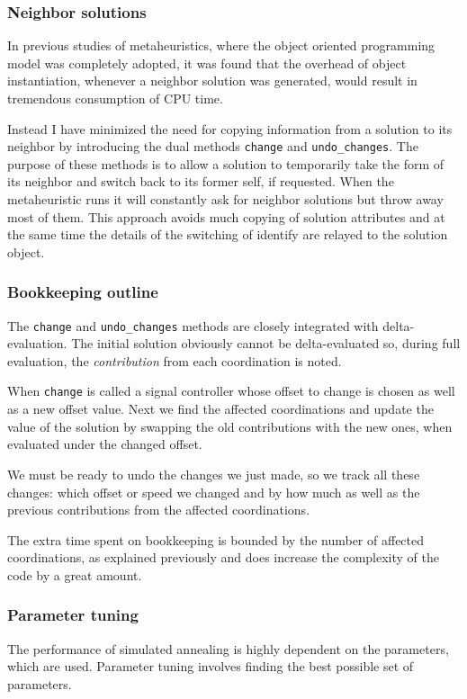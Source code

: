 \subsubsection{Neighbor solutions}
In previous studies of metaheuristics, where the object oriented programming model was completely adopted, it was found that the overhead of object instantiation, whenever a neighbor solution was generated, would result in tremendous consumption of CPU time. 

Instead I have minimized the need for copying information from a solution to its neighbor by introducing the dual methods \verb|change| and \verb|undo_changes|. The purpose of these methods is to allow a solution to temporarily take the form of its neighbor and switch back to its former self, if requested. 
When the metaheuristic runs it will constantly ask for neighbor solutions but throw away most of them. This approach avoids much copying of solution attributes and at the same time the details of the switching of identify are relayed to the solution object.

\subsubsection{Bookkeeping outline}
The \verb|change| and \verb|undo_changes| methods are closely integrated with delta-evaluation. The initial solution obviously cannot be delta-evaluated so, during full evaluation, the \textit{contribution} from each coordination is noted. 

When \verb|change| is called a signal controller whose offset to change is chosen as well as a new offset value. Next we find the affected coordinations and update the value of the solution by swapping the old contributions with the new ones, when evaluated under the changed offset.

We must be ready to undo the changes we just made, so we track all these changes: which offset or speed we changed and by how much as well as the previous contributions from the affected coordinations.

The extra time spent on bookkeeping is bounded by the number of affected coordinations, as explained previously and does increase the complexity of the code by a great amount.

\subsubsection{Parameter tuning}
The performance of simulated annealing is highly dependent on the parameters, which are used. Parameter tuning involves finding the best possible set of parameters. 

